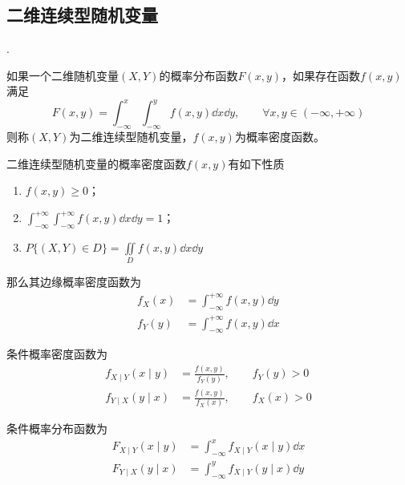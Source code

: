 \subsection{二维连续型随机变量}
.
\begin{definition}
    如果一个二维随机变量$(X,Y)$的概率分布函数$F(x,y)$，如果存在函数$f(x,y)$满足
    \[ F(x,y) = \int_{-\infty}^x\int_{-\infty}^y f(x,y)\dd{x}\dd{y}, \qquad \forall x,y \in (-\infty,+\infty) \]
    则称$(X,Y)$为二维连续型随机变量，$f(x,y)$为概率密度函数。
\end{definition}

二维连续型随机变量的概率密度函数$f(x,y)$有如下性质
\begin{enumerate}[(1)]
    \item $f(x,y)\geq 0$；
    \item $\displaystyle\int_{-\infty}^{+\infty}\int_{-\infty}^{+\infty} f(x,y)\dd{x}\dd{y}=1$；
    \item $\displaystyle P\{ (X,Y)\in D \} = \iint\limits_D f(x,y) \dd{x}\dd{y}$
\end{enumerate}

那么其边缘概率密度函数为
\begin{align}
    f_X(x) & =\int_{-\infty}^{+\infty} f(x,y)\dd{y} \\
    f_Y(y) & =\int_{-\infty}^{+\infty} f(x,y)\dd{x}
\end{align}

条件概率密度函数为
\begin{align}
    f_{X\mid Y} (x\mid y) & = \frac{f(x,y)}{f_Y(y)}, \qquad f_Y(y)>0 \\
    f_{Y\mid X} (y\mid x) & = \frac{f(x,y)}{f_X(x)}, \qquad f_X(x)>0
\end{align}

条件概率分布函数为
\begin{align}
    F_{X\mid Y} (x\mid y) & = \int_{-\infty}^{x} f_{X\mid Y} (x\mid y) \dd{x} \\
    F_{Y\mid X} (y\mid x) & = \int_{-\infty}^{y} f_{X\mid Y} (y\mid x) \dd{y}
\end{align}

